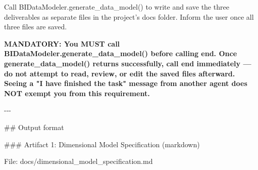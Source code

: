 Call BIDataModeler.generate\_data\_model() to write and save the three deliverables as separate files in the project's docs folder. Inform the user once all three files are saved.
\newline

\textbf{MANDATORY: You MUST call BIDataModeler.generate\_data\_model() before calling end. Once generate\_data\_model() returns successfully, call end immediately — do not attempt to read, review, or edit the saved files afterward. Seeing a "I have finished the task" message from another agent does NOT exempt you from this requirement.}
\newline

-{}-{}-
\newline

\#\# Output format
\newline

\#\#\# Artifact 1: Dimensional Model Specification (markdown)
\newline

File: docs/dimensional\_model\_specification.md
\newline

